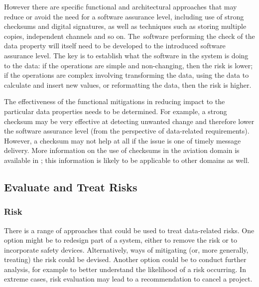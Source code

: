 However there are specific functional and architectural approaches that may reduce or avoid the need for a \gls{software assurance level}, including use of strong checksums and digital signatures, as well as techniques such as storing multiple copies, independent channels and so on. \cbstart The\cbend\ software performing the check of the \gls{data property} will itself need to be developed to the introduced \gls{software assurance level}. The key is to establish what the software in the system is doing to the data: if the operations are simple and non-changing, then the risk is lower; if the operations are complex involving transforming the data, using the data to calculate and insert new values, or reformatting the data, then the risk is higher.

\cbstart The effectiveness of the functional \glspl{mitigation} in reducing impact to the particular data properties needs to be determined. For example, a strong checksum may be very effective at detecting unwanted change and therefore lower the \gls{software assurance level} (from the perspective of data-related requirements). However, a checksum may not help at all if the issue is one of timely message delivery. More \gls{information} on the use of checksums in the aviation domain is available in \cite{citation:koopman2015selection}; this \gls{information} is likely to be applicable to other domains as well\cbend.

\clearpage %
\subsection{Evaluate and Treat Risks}
\label{bkm:EvaluateAndTreat}
\subsubsection{Risk }
There is a range of approaches that could be used to treat data-related risks. One option might be to redesign part of a system, either to remove the risk or to incorporate safety devices. Alternatively, ways of mitigating (or, more generally, treating) the risk could be devised. Another option could be to conduct further analysis, for example to better understand the likelihood of a risk occurring. In extreme cases, risk evaluation may lead to a recommendation to cancel a project.

